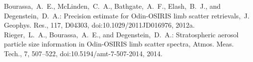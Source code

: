 \documentclass[12pt, notitlepage]{article}
\begin{document}
\hrulefill

Bourassa,~A.~E., McLinden,~C.~A., Bathgate,~A.~F., Elash,~B.~J., and
Degenstein,~D.~A.: Precision estimate for Odin-OSIRIS limb scatter
retrievals,~J. Geophys. Res., 117, D04303,
doi:10.1029/2011JD016976,
2012a.\\

Rieger,~L.~A., Bourassa,~A.~E., and Degenstein,~D.~A.: Stratospheric aerosol
particle size information in Odin-OSIRIS limb scatter spectra, Atmos. Meas.
Tech., 7, 507--522,
doi:10.5194/amt-7-507-2014,
2014.
\end{document}
